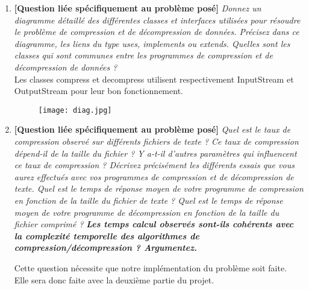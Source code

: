 \documentclass[11pt]{article}
\begin{document}
\begin{enumerate}
\item \textbf{[Question liée spécifiquement au problème posé]} \textit{Donnez un diagramme détaillé des différentes classes et interfaces utilisées pour résoudre le problème de compression et de décompression de données. Précisez dans ce diagramme, les liens du type uses, implements ou extends. Quelles sont les classes qui sont communes entre les programmes de compression et de décompression de données ?}\bigskip \\
Les classes compress et decompress utilisent respectivement InputStream et OutputStream pour leur bon fonctionnement. \bigskip
\begin{figure} [!h]
\center
\texttt{[image: diag.jpg]}
\end{figure}
\bigskip

\newpage
\item \textbf{[Question liée spécifiquement au problème posé]} \textit{Quel est le taux de compression observé sur différents fichiers de texte ? Ce taux de compression dépend-il
de la taille du fichier ? Y a-t-il d’autres paramètres qui influencent ce taux de
compression ? Décrivez précisément les différents essais que vous aurez effectués
avec vos programmes de compression et de décompression de texte.
Quel est le temps de réponse moyen de votre programme de compression en
fonction de la taille du fichier de texte ? Quel est le temps de réponse moyen de
votre programme de décompression en fonction de la taille du fichier comprimé ?}
\textit{\textbf{Les temps calcul observés sont-ils cohérents avec la complexité temporelle
des algorithmes de compression/décompression ? Argumentez.}}
\bigskip

Cette question nécessite que notre implémentation du problème soit faite. 
Elle sera donc faite avec la deuxième partie du projet.

\end{enumerate}
\end{document}
